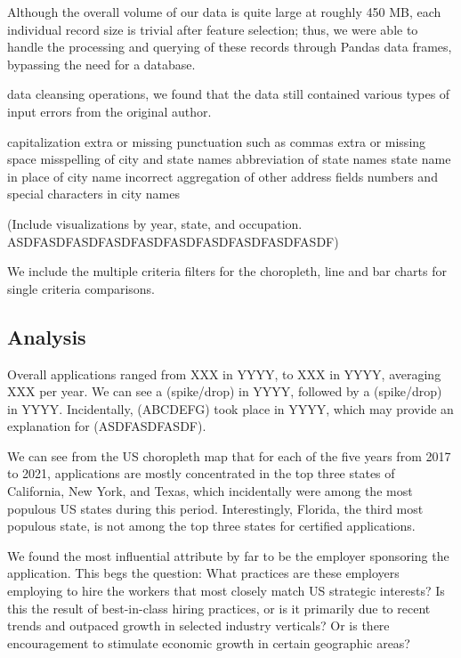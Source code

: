 \documentclass[sigconf]{acmart}
\begin{document}
Although the overall volume of our data is quite large at roughly 450 MB, 
each individual record size is trivial after feature selection; thus, we 
were able to handle the processing and querying of these records through Pandas data frames, 
bypassing the need for a database. 





data cleansing operations, we found that the data still contained various types of input errors from the original 
author. 


capitalization
extra or missing punctuation such as commas
extra or missing space 
misspelling of city and state names 
abbreviation of state names
state name in place of city name 
incorrect aggregation of other address fields
numbers and special characters in city names 

(Include visualizations by year, state, and occupation. ASDFASDFASDFASDFASDFASDFASDFASDFASDFASDF)


We include the multiple criteria filters for the choropleth, line and 
bar charts for single criteria comparisons. 



\subsection{Analysis}

Overall applications ranged from XXX in YYYY, to XXX in YYYY, averaging XXX per year. 
We can see a (spike/drop) in YYYY, followed by a (spike/drop) in YYYY. 
Incidentally, (ABCDEFG) took place in YYYY, which may provide an explanation for (ASDFASDFASDF).


We can see from the US choropleth map that for each of the five years from 2017 to 2021, applications are mostly 
concentrated in the top three states of California, 
New York, and Texas, which incidentally were among the most populous US states during this period. 
Interestingly, Florida, the third most populous state, is not among the top three states for certified applications. 


We found the most influential attribute by far to be the employer sponsoring 
the application. This begs the question: What practices are these employers employing 
to hire the workers that most closely match US strategic interests? 
Is this the result of best-in-class hiring practices, or is it primarily due to 
recent trends and outpaced growth in selected industry verticals? 
Or is there encouragement to stimulate economic growth in certain geographic areas? 
\end{document}

